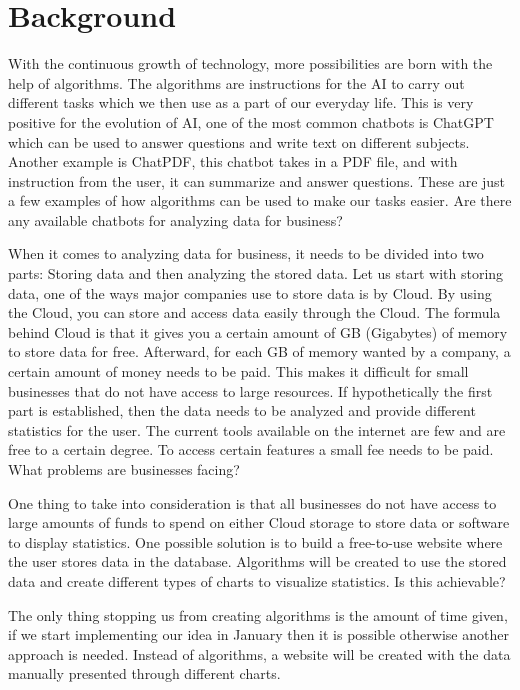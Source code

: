 \section{Background}
With the continuous growth of technology, more possibilities are born with the help of algorithms. The algorithms are instructions for the AI to carry out different tasks which we then use as a part of our everyday life. This is very positive for the evolution of AI, one of the most common chatbots is ChatGPT which can be used to answer questions and write text on different subjects. Another example is ChatPDF, this chatbot takes in a PDF file, and with instruction from the user, it can summarize and answer questions. These are just a few examples of how algorithms can be used to make our tasks easier. Are there any available chatbots for analyzing data for business?

When it comes to analyzing data for business, it needs to be divided into two parts: Storing data and then analyzing the stored data. Let us start with storing data, one of the ways major companies use to store data is by Cloud. By using the Cloud, you can store and access data easily through the Cloud.  The formula behind Cloud is that it gives you a certain amount of GB (Gigabytes) of memory to store data for free. Afterward, for each GB of memory wanted by a company, a certain amount of money needs to be paid. This makes it difficult for small businesses that do not have access to large resources. If hypothetically the first part is established, then the data needs to be analyzed and provide different statistics for the user. The current tools available on the internet are few and are free to a certain degree. To access certain features a small fee needs to be paid.  What problems are businesses facing?

One thing to take into consideration is that all businesses do not have access to large amounts of funds to spend on either Cloud storage to store data or software to display statistics. One possible solution is to build a free-to-use website where the user stores data in the database. Algorithms will be created to use the stored data and create different types of charts to visualize statistics. Is this achievable?

The only thing stopping us from creating algorithms is the amount of time given, if we start implementing our idea in January then it is possible otherwise another approach is needed. Instead of algorithms, a website will be created with the data manually presented through different charts.  
